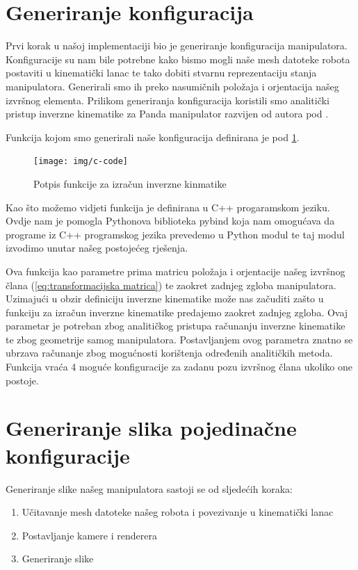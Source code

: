 \documentclass[times, utf8, diplomskirad]{fer}
\begin{document}
\section{Generiranje konfiguracija}
\label{pog:konfig}
Prvi korak u našoj implementaciji bio je generiranje konfiguracija manipulatora.
Konfiguracije su nam bile potrebne kako bismo mogli naše mesh datoteke robota postaviti u kinematički lanac te tako dobiti stvarnu reprezentaciju stanja manipulatora.
Generirali smo ih preko nasumičnih položaja i orjentacija našeg izvršnog elementa.
Prilikom generiranja konfiguracija koristili smo analitički pristup inverzne kinematike za Panda manipulator razvijen od autora pod \cite{9646185}.

Funkcija kojom smo generirali naše konfiguracija definirana je pod \ref{fig:configuration-func}.

\begin{figure}[H]
    \centering
    \texttt{[image: img/c-code]}
    \caption{Potpis funkcije za izračun inverzne kinmatike}
    \label{fig:configuration-func}
\end{figure}

Kao što možemo vidjeti funkcija je definirana u C++ progaramskom jeziku.
Ovdje nam je pomogla Pythonova biblioteka pybind koja nam omogućava da programe iz C++ programskog jezika prevedemo u Python modul te taj modul izvodimo unutar našeg postojećeg rješenja.

Ova funkcija kao parametre prima matricu položaja i orjentacije našeg izvršnog člana (\ref{eq:transformacijska matrica}) te zaokret zadnjeg zgloba manipulatora.
Uzimajući u obzir definiciju inverzne kinematike može nas začuditi zašto u funkciju za izračun inverzne kinematike predajemo zaokret zadnjeg zgloba.
Ovaj parametar je potreban zbog analitičkog pristupa računanju inverzne kinematike te zbog geometrije samog manipulatora.
Postavljanjem ovog parametra znatno se ubrzava računanje zbog mogućnosti korištenja određenih analitičkih metoda.
Funkcija vraća 4 moguće konfiguracije za zadanu pozu izvršnog člana ukoliko one postoje.

\section{Generiranje slika pojedinačne konfiguracije}
Generiranje slike našeg manipulatora sastoji se od sljedećih koraka:
\begin{enumerate}
    \item Učitavanje mesh datoteke našeg robota i povezivanje u kinematički lanac
    \item Postavljanje kamere i renderera
    \item Generiranje slike
\end{enumerate}
\end{document}
